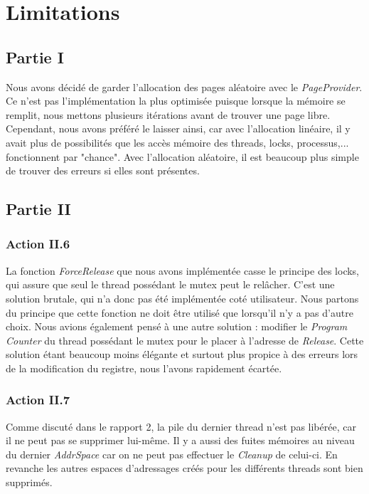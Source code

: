 \documentclass{article}
\begin{document}
\section{Limitations}
\subsection{Partie I}
Nous avons décidé de garder l'allocation des pages aléatoire avec le \textit{PageProvider}. Ce n'est pas
l'implémentation la plus optimisée puisque lorsque la mémoire se remplit, nous mettons plusieurs itérations avant
de trouver une page libre. Cependant, nous avons préféré le laisser ainsi, car avec l'allocation linéaire, il y avait
plus de possibilités que les accès mémoire des threads, locks, processus,... fonctionnent par "chance". Avec l'allocation
aléatoire, il est beaucoup plus simple de trouver des erreurs si elles sont présentes.

\subsection{Partie II}
\subsubsection{Action II.6}
La fonction \textit{ForceRelease} que nous avons implémentée casse le principe des locks, qui assure que seul le thread possédant le mutex peut le relâcher.
C'est une solution brutale, qui n'a donc pas été implémentée coté utilisateur. Nous partons du principe que cette fonction ne doit être utilisé que
lorsqu'il n'y a pas d'autre choix. Nous avions également pensé à une autre solution : modifier le \textit{Program Counter} du thread possédant
le mutex pour le placer à l'adresse de \textit{Release}. Cette solution étant beaucoup moins élégante et surtout plus propice à des erreurs lors de la
modification du registre, nous l'avons rapidement écartée.

\subsubsection{Action II.7}
Comme discuté dans le rapport 2, la pile du dernier thread n'est pas libérée, car il ne peut pas se supprimer lui-même. Il y a aussi des fuites mémoires au niveau
du dernier \textit{AddrSpace} car on ne peut pas effectuer le \textit{Cleanup} de celui-ci. En revanche les autres espaces d'adressages créés pour les différents
threads sont bien supprimés.
\end{document}
